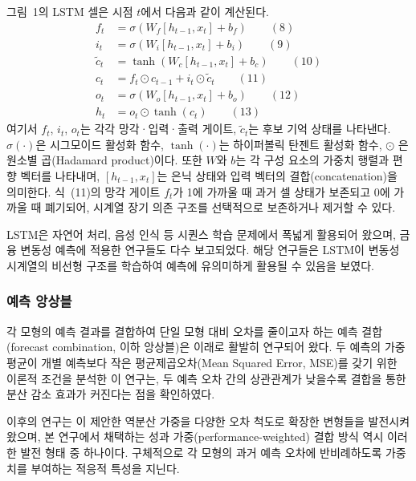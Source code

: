 \documentclass{article}
\begin{document}
그림~1의 LSTM 셀은 시점 $t$에서 다음과 같이 계산된다.
\begin{align}
f_t &= \sigma(W_f [h_{t-1}, x_t] + b_f) \qquad(8)\\
i_t &= \sigma(W_i [h_{t-1}, x_t] + b_i) \qquad(9)\\
\tilde{c}_t &= \tanh(W_c [h_{t-1}, x_t] + b_c) \qquad(10)\\
c_t &= f_t \odot c_{t-1} + i_t \odot \tilde{c}_t \qquad(11)\\
o_t &= \sigma(W_o [h_{t-1}, x_t] + b_o) \qquad(12)\\
h_t &= o_t \odot \tanh(c_t) \qquad(13)\end{align}
여기서 $f_t$, $i_t$, $o_t$는 각각 망각·입력·출력 게이트, $\tilde{c}_t$는 후보 기억 상태를 나타낸다. $\sigma(\cdot)$은 시그모이드 활성화 함수, $\tanh(\cdot)$는 하이퍼볼릭 탄젠트 활성화 함수, $\odot$ 은 원소별 곱(Hadamard product)이다. 또한 \(W\)와 \(b\)는 각 구성 요소의 가중치 행렬과 편향 벡터를 나타내며, \([h_{t-1}, x_t]\)는 은닉 상태와 입력 벡터의 결합(concatenation)을 의미한다. 식~(11)의 망각 게이트 $f_t$가 1에 가까울 때 과거 셀 상태가 보존되고 0에 가까울 때 폐기되어, 시계열 장기 의존 구조를 선택적으로 보존하거나 제거할 수 있다.

LSTM은 자연어 처리, 음성 인식 등 시퀀스 학습 문제에서 폭넓게 활용되어 왔으며, 금융 변동성 예측에 적용한 연구들도 다수 보고되었다\citep{bucci2020realized, kim2018forecasting}. 해당 연구들은 LSTM이 변동성 시계열의 비선형 구조를 학습하여 예측에 유의미하게 활용될 수 있음을 보였다.

\subsubsection{예측 앙상블}
\label{subsubsec:ens_review}

각 모형의 예측 결과를 결합하여 단일 모형 대비 오차를 줄이고자 하는 예측 결합(forecast combination, 이하 앙상블)은 \citet{bates1969combination} 이래로 활발히 연구되어 왔다. 두 예측의 가중 평균이 개별 예측보다 작은 평균제곱오차(Mean Squared Error, MSE)를 갖기 위한 이론적 조건을 분석한 이 연구는, 두 예측 오차 간의 상관관계가 낮을수록 결합을 통한 분산 감소 효과가 커진다는 점을 확인하였다.

이후의 연구는 \citet{bates1969combination}이 제안한 역분산 가중을 다양한 오차 척도로 확장한 변형들을 발전시켜 왔으며\citep{timmermann2006forecast}, 본 연구에서 채택하는 성과 가중(performance-weighted) 결합 방식 역시 이러한 발전 형태 중 하나이다. 구체적으로 각 모형의 과거 예측 오차에 반비례하도록 가중치를 부여하는 적응적 특성을 지닌다.
\end{document}
